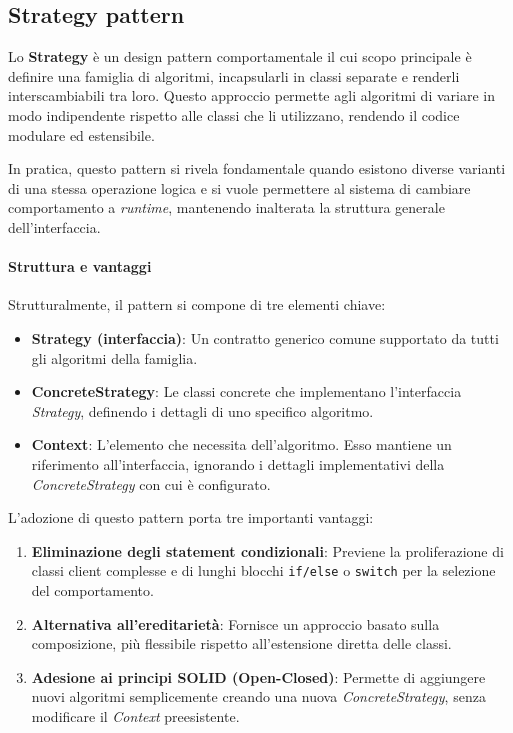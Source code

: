 \documentclass[11pt,a4paper]{article}
\begin{document}
\newpage

\subsection{Strategy pattern}
Lo \textbf{Strategy} è un design pattern comportamentale il cui scopo principale è definire una famiglia di algoritmi, incapsularli in classi separate e renderli interscambiabili tra loro. Questo approccio permette agli algoritmi di variare in modo indipendente rispetto alle classi che li utilizzano, rendendo il codice modulare ed estensibile.

In pratica, questo pattern si rivela fondamentale quando esistono diverse varianti di una stessa operazione logica e si vuole permettere al sistema di cambiare comportamento a \textit{runtime}, mantenendo inalterata la struttura generale dell'interfaccia.

\paragraph{Struttura e vantaggi}
Strutturalmente, il pattern si compone di tre elementi chiave:
\begin{itemize}
    \item \textbf{Strategy (interfaccia)}: Un contratto generico comune supportato da tutti gli algoritmi della famiglia.
    \item \textbf{ConcreteStrategy}: Le classi concrete che implementano l'interfaccia \textit{Strategy}, definendo i dettagli di uno specifico algoritmo.
    \item \textbf{Context}: L'elemento che necessita dell'algoritmo. Esso mantiene un riferimento all'interfaccia, ignorando i dettagli implementativi della \textit{ConcreteStrategy} con cui è configurato.
\end{itemize}

L'adozione di questo pattern porta tre importanti vantaggi:
\begin{enumerate}
    \item \textbf{Eliminazione degli statement condizionali}: Previene la proliferazione di classi client complesse e di lunghi blocchi \texttt{if/else} o \texttt{switch} per la selezione del comportamento.
    \item \textbf{Alternativa all'ereditarietà}: Fornisce un approccio basato sulla composizione, più flessibile rispetto all'estensione diretta delle classi.
    \item \textbf{Adesione ai principi SOLID (Open-Closed)}: Permette di aggiungere nuovi algoritmi semplicemente creando una nuova \textit{ConcreteStrategy}, senza modificare il \textit{Context} preesistente.
\end{enumerate}
\end{document}
